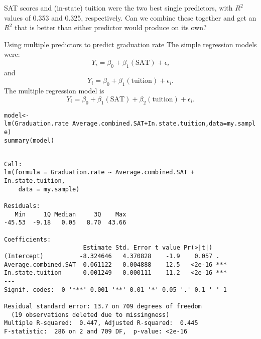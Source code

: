 \documentclass{beamer}\usepackage[]{graphicx}\usepackage[]{color}
\makeatletter
\newcommand{\hlopt}[1]{\textcolor[rgb]{1,0.894,0.769}{#1}}%
\newcommand{\hlstd}[1]{\textcolor[rgb]{1,0.894,0.769}{#1}}%
\newcommand{\hlkwb}[1]{\textcolor[rgb]{0.804,0.776,0.451}{#1}}%
\newcommand{\hlkwc}[1]{\textcolor[rgb]{0.78,0.941,0.545}{#1}}%
\newcommand{\hlkwd}[1]{\textcolor[rgb]{1,0.78,0.769}{#1}}%
\newenvironment{kframe}{%
 \def\at@end@of@kframe{}%
 \ifinner\ifhmode%
  \def\at@end@of@kframe{\end{minipage}}%
  \begin{minipage}{\columnwidth}%
 \fi\fi%
 \def\FrameCommand##1{\hskip\@totalleftmargin \hskip-\fboxsep
 \colorbox{shadecolor}{##1}\hskip-\fboxsep
     \hskip-\linewidth \hskip-\@totalleftmargin \hskip\columnwidth}%
 \MakeFramed {\advance\hsize-\width
   \@totalleftmargin\z@ \linewidth\hsize
   \@setminipage}}%
 {\par\unskip\endMakeFramed%
 \at@end@of@kframe}
\newenvironment{knitrout}{}{} %
\makeatother
\begin{document}
\begin{darkframes}
    \begin{frame}[fragile]

      \begin{center}
        SAT scores and (in-state) tuition were the two best single predictors, with $R^2$ values of 0.353 and 0.325, respectively. Can we combine these together and get an $R^2$ that is better than either predictor would produce on its own?
      \end{center}
    \end{frame}

    \begin{frame}{Using multiple predictors to predict graduation rate}
      The simple regression models were:
      \[
        Y_i = \beta_0 + \beta_1 (\text{SAT}) + \epsilon_i
      \]
      and
      \[
        Y_i = \beta_0 + \beta_1 (\text{tuition}) + \epsilon_i.
      \]
      The multiple regression model is
      \[
        Y_i = \beta_0 + \beta_1 (\text{SAT}) + \beta_2 (\text{tuition}) + \epsilon_i.
      \]
    \end{frame}

    \begin{frame}[fragile]
      \fontsize{8}{8}
\begin{knitrout}
\color{fgcolor}\begin{kframe}
\begin{alltt}
\hlstd{model} \hlkwb{<-} \hlkwd{lm}\hlstd{(Graduation.rate} \hlopt{~} \hlstd{Average.combined.SAT} \hlopt{+} \hlstd{In.state.tuition,} \hlkwc{data}\hlstd{=my.sample)}
\hlkwd{summary}\hlstd{(model)}
\end{alltt}
\begin{verbatim}

Call:
lm(formula = Graduation.rate ~ Average.combined.SAT + In.state.tuition, 
    data = my.sample)

Residuals:
   Min     1Q Median     3Q    Max 
-45.53  -9.18   0.05   8.70  43.66 

Coefficients:
                      Estimate Std. Error t value Pr(>|t|)    
(Intercept)          -8.324646   4.370828    -1.9    0.057 .  
Average.combined.SAT  0.061122   0.004888    12.5   <2e-16 ***
In.state.tuition      0.001249   0.000111    11.2   <2e-16 ***
---
Signif. codes:  0 '***' 0.001 '**' 0.01 '*' 0.05 '.' 0.1 ' ' 1

Residual standard error: 13.7 on 709 degrees of freedom
  (19 observations deleted due to missingness)
Multiple R-squared:  0.447,	Adjusted R-squared:  0.445 
F-statistic:  286 on 2 and 709 DF,  p-value: <2e-16
\end{verbatim}
\end{kframe}
\end{knitrout}
    \end{frame}


\end{darkframes}
\end{document}
